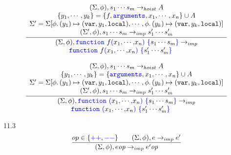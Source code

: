 \documentclass[a4paper]{article}
\newcommand{\code}[1]{\textcolor{blue}{\tt #1}}
\newcommand{\mydot}{.\,}
\newcommand{\var}{{\tt{var}}}
\newcommand{\local}{{\tt{local}}}
\begin{document}
\begin{equation*}
\frac{
    \begin{array}{c}
    (\Sigma, \phi), s_1 \cdots s_m \rightarrow_{hoist} A \\
    \{ y_1, \cdots, y_k \} = \{ f, \code{arguments}, x_1, \cdots, x_n \} \cup A \\
    \Sigma' = \Sigma [ \phi \code{\mydot} (y_1) \mapsto (\var, y_1, \local), \cdots, \phi \code{\mydot} (y_k) \mapsto (\var, y_k, \local) ] \\
    (\Sigma', \phi), s_1 \cdots s_m \rightarrow_{imp} s'_1 \cdots s'_m \\
    \end{array}
}{
    \begin{array}{l}
    (\Sigma, \phi), \code{function}\ f \code{(} x_1 \code{,} \cdots \code{,} x_n \code{)}\ \code{\{} s_1 \cdots s_m \code{\}} \rightarrow_{imp} \\
    \qquad \code{function}\ f \code{(} x_1 \code{,} \cdots \code{,} x_n \code{)}\ \code{\{} s'_1 \cdots s'_m \code{\}}
    \end{array}
}
\end{equation*}

\begin{equation*}
\frac{
    \begin{array}{c}
    (\Sigma, \phi), s_1 \cdots s_m \rightarrow_{hoist} A \\
    \{ y_1, \cdots, y_k \} = \{ \code{arguments}, x_1, \cdots, x_n \} \cup A \\
    \Sigma' = \Sigma [ \phi \code{\mydot} (y_1) \mapsto (\var, y_1, \local), \cdots, \phi \code{\mydot} (y_k) \mapsto (\var, y_k, \local) ] \\
    (\Sigma', \phi), s_1 \cdots s_m \rightarrow_{imp} s'_1 \cdots s'_m \\
    \end{array}
}{
    \begin{array}{l}
    (\Sigma, \phi), \code{function}\ \code{(} x_1 \code{,} \cdots \code{,} x_n \code{)}\ \code{\{} s_1 \cdots s_m \code{\}} \rightarrow_{imp} \\
    \qquad \code{function}\ \code{(} x_1 \code{,} \cdots \code{,} x_n \code{)}\ \code{\{} s'_1 \cdots s'_m \code{\}}
    \end{array}
}
\end{equation*}

11.3
\begin{equation*}
\frac{
    op \in \{ \code{++}, \code{--} \} \qquad
    (\Sigma, \phi), e \rightarrow_{imp} e'
}{
    (\Sigma, \phi), e \emph{op} \rightarrow_{imp} e' \emph{op}
}
\end{equation*}
\end{document}
